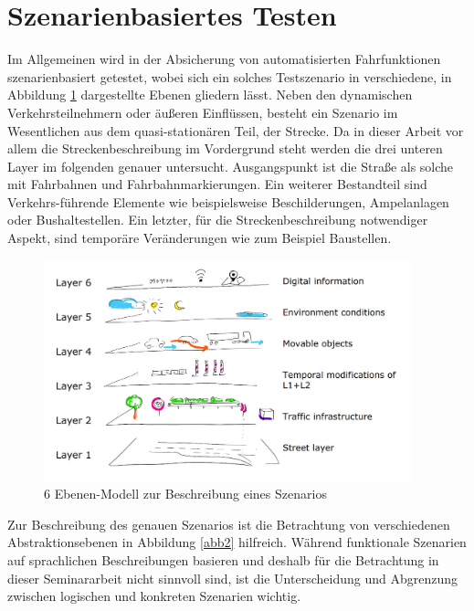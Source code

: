 \section{Szenarienbasiertes Testen}
Im Allgemeinen wird in der Absicherung von automatisierten Fahrfunktionen szenarienbasiert getestet, wobei sich ein solches Testszenario in verschiedene, in Abbildung \ref{abb1} dargestellte Ebenen gliedern lässt.\cite{Szenarienbeschreibung.2019} Neben den dynamischen Verkehrsteilnehmern oder äußeren Einflüssen, besteht ein Szenario im Wesentlichen aus dem quasi-stationären Teil, der Strecke. Da in dieser Arbeit vor allem die Streckenbeschreibung im Vordergrund steht werden die drei unteren Layer im folgenden genauer untersucht.
Ausgangspunkt ist die Straße als solche mit Fahrbahnen und Fahrbahnmarkierungen. Ein weiterer Bestandteil sind Verkehrs-führende Elemente wie beispielsweise Beschilderungen, Ampelanlagen oder Bushaltestellen. Ein letzter, für die Streckenbeschreibung notwendiger Aspekt, sind temporäre Veränderungen wie zum Beispiel Baustellen.

\begin{figure}[H]
\flushleft
\includegraphics[width=0.95\textwidth]{fig/fig1.png}
\caption{6 Ebenen-Modell zur Beschreibung eines Szenarios \cite{Eckstein.2018}}
\label{abb1}
\end{figure}

Zur Beschreibung des genauen Szenarios ist die Betrachtung von verschiedenen Abstraktionsebenen in Abbildung \ref{abb2} hilfreich. Während funktionale Szenarien auf sprachlichen Beschreibungen basieren und deshalb für die Betrachtung in dieser Seminararbeit nicht sinnvoll sind, ist die Unterscheidung und Abgrenzung zwischen logischen und konkreten Szenarien wichtig.

